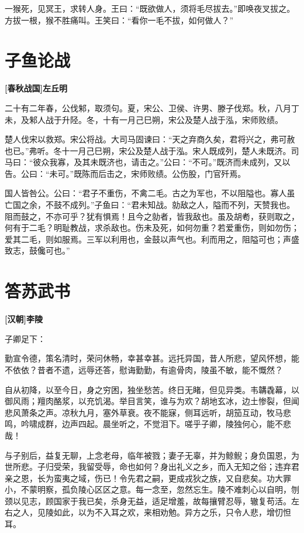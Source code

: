 \documentclass[UTF8,titlepage,oneside]{ctexbook}
\begin{document}
一猴死，见冥王，求转人身。王曰：“既欲做人，须将毛尽拔去。”即唤夜叉拔之。方拔一根，猴不胜痛叫。王笑曰：“看你一毛不拔，如何做人？”

\chapter*{子鱼论战}
\begin{center}
	\textbf{[春秋战国]左丘明}
\end{center}


二十有二年春，公伐邾，取须句。夏，宋公、卫侯、许男、滕子伐郑。秋，八月丁未，及邾人战于升陉。冬，十有一月己巳朔，宋公及楚人战于泓，宋师败绩。


楚人伐宋以救郑。宋公将战。大司马固谏曰：“天之弃商久矣，君将兴之，弗可赦也已。”弗听。冬十一月己巳朔，宋公及楚人战于泓。宋人既成列，楚人未既济。司马曰：“彼众我寡，及其未既济也，请击之。”公曰：“不可。”既济而未成列，又以告。公曰：“未可。”既陈而后击之，宋师败绩。公伤股，门官歼焉。


国人皆咎公。公曰：“君子不重伤，不禽二毛。古之为军也，不以阻隘也。寡人虽亡国之余，不鼓不成列。”子鱼曰：“君未知战。勍敌之人，隘而不列，天赞我也。阻而鼓之，不亦可乎？犹有惧焉！且今之勍者，皆我敌也。虽及胡耇，获则取之，何有于二毛？明耻教战，求杀敌也。伤未及死，如何勿重？若爱重伤，则如勿伤；爱其二毛，则如服焉。三军以利用也，金鼓以声气也。利而用之，阻隘可也；声盛致志，鼓儳可也。”



\chapter*{答苏武书}
\begin{center}
	\textbf{[汉朝]李陵}
\end{center}

子卿足下：

勤宣令德，策名清时，荣问休畅，幸甚幸甚。远托异国，昔人所悲，望风怀想，能不依依？昔者不遗，远辱还答，慰诲勤勤，有逾骨肉，陵虽不敏，能不慨然？

自从初降，以至今日，身之穷困，独坐愁苦。终日无睹，但见异类。韦韝毳幕，以御风雨；羶肉酪浆，以充饥渴。举目言笑，谁与为欢？胡地玄冰，边土惨裂，但闻悲风萧条之声。凉秋九月，塞外草衰。夜不能寐，侧耳远听，胡笳互动，牧马悲鸣，吟啸成群，边声四起。晨坐听之，不觉泪下。嗟乎子卿，陵独何心，能不悲哉！

与子别后，益复无聊，上念老母，临年被戮；妻子无辜，并为鲸鲵；身负国恩，为世所悲。子归受荣，我留受辱，命也如何？身出礼义之乡，而入无知之俗；违弃君亲之恩，长为蛮夷之域，伤已！令先君之嗣，更成戎狄之族，又自悲矣。功大罪小，不蒙明察，孤负陵心区区之意。每一念至，忽然忘生。陵不难刺心以自明，刎颈以见志，顾国家于我已矣，杀身无益，适足增羞，故每攘臂忍辱，辙复苟活。左右之人，见陵如此，以为不入耳之欢，来相劝勉。异方之乐，只令人悲，增忉怛耳。
\end{document}

